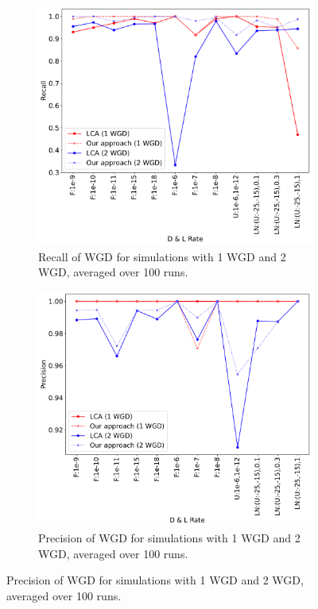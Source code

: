\documentclass[10pt]{article}
\begin{document}
\begin{figure}[h!]
    \centering
    \begin{subfigure}[b]{0.48\textwidth}
        \centering
        \includegraphics[width=\textwidth]{figs_shortversion/recall-WGD-t10-t80-Avg_recall-2W-WGD-t20-t80-Avg.pdf}
        \caption{Recall of WGD for simulations with 1 WGD and 2 WGD, averaged over 100 runs.}
        \label{fig:recall-wgd-1wgd}
    \end{subfigure}
    \hfill
    \begin{subfigure}[b]{0.48\textwidth}
        \centering
        \includegraphics[width=\textwidth]{figs_shortversion/precision-WGD-t10-t80-Avg_precision-2W-WGD-t20-t80-Avg.pdf}
        \caption{Precision of WGD for simulations with 1 WGD and 2 WGD, averaged over 100 runs.}
        \label{fig:precision-wgd-1wgd}
    \end{subfigure}
    

\end{figure}
\end{document}
